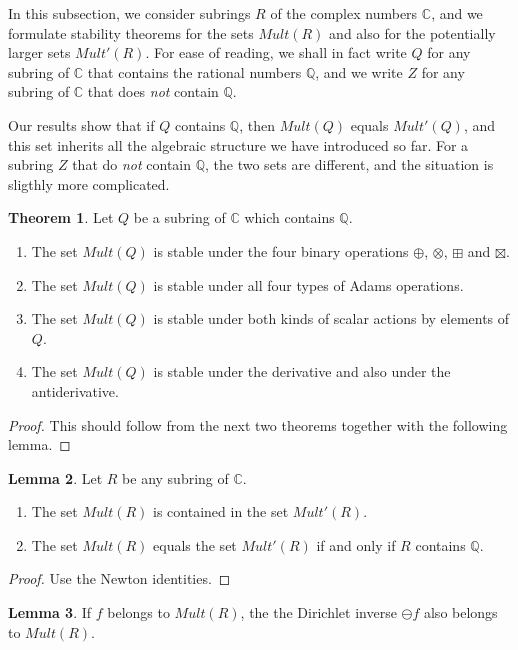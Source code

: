 \documentclass[a4paper]{article}
\theoremstyle{definition}
\newtheorem{theorem}{Theorem}[section]
\newtheorem{lemma}[theorem]{Lemma}
\theoremstyle{remark}
\newcommand{\Q}{\mathbb{Q}}
\newcommand{\C}{\mathbb{C}}
\begin{document}
In this subsection, we consider subrings $R$ of the complex numbers $\C$, and we formulate stability theorems for the sets $Mult(R)$ and also for the potentially larger sets $Mult'(R)$. For ease of reading, we shall in fact write $Q$ for any subring of $\C$ that contains the rational numbers $\Q$, and we write $Z$ for any subring of $\C$ that does \emph{not} contain $\Q$. 

Our results show that if $Q$ contains $\Q$, then $Mult(Q)$ equals $Mult'(Q)$, and this set inherits all the algebraic structure we have introduced so far. For a subring $Z$ that do \emph{not} contain $\Q$, the two sets are different, and the situation is sligthly more complicated.



\begin{theorem}
Let $Q$ be a subring of $\C$ which contains $\Q$. 
\begin{enumerate}
\item The set $Mult(Q)$ is stable under the four binary operations $\oplus$, $\otimes$, $\boxplus$ and $\boxtimes$.
\item The set $Mult(Q)$ is stable under all four types of Adams operations. 
\item The set $Mult(Q)$ is stable under both kinds of scalar actions by elements of $Q$.
\item The set $Mult(Q)$ is stable under the derivative and also under the antiderivative.
\end{enumerate}
\end{theorem}

\begin{proof}
This should follow from the next two theorems together with the following lemma. 
\end{proof}

\begin{lemma}
Let $R$ be any subring of $\C$. 
\begin{enumerate}
\item The set $Mult(R)$ is contained in the set $Mult'(R)$.
\item The set $Mult(R)$ equals the set $Mult'(R)$ if and only if $R$ contains $\Q$.
\end{enumerate}
\end{lemma}
\begin{proof}
Use the Newton identities.
\end{proof}

\begin{lemma}
If $f$ belongs to $Mult(R)$, the the Dirichlet inverse $\ominus f$ also belongs to $Mult(R)$. 
\end{lemma}
\end{document}
